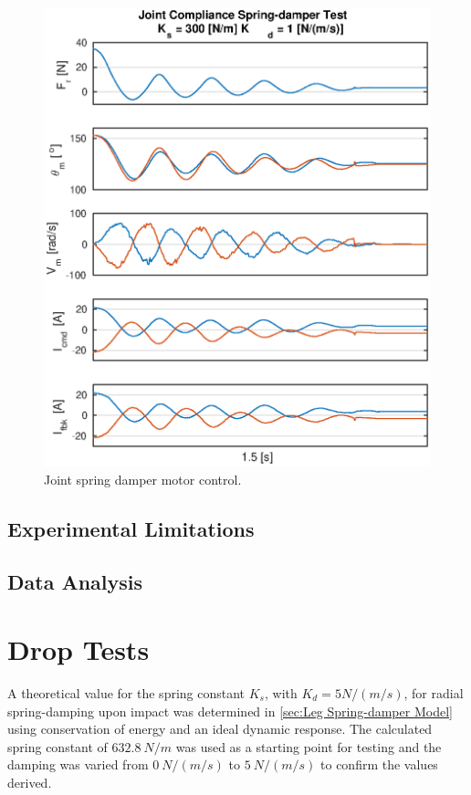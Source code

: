 \begin{figure}
\centering
\includegraphics[width=1\textwidth]{images/experiments/joint-spring-damper-control-output.eps} 
\caption{Joint spring damper motor control.}
\label{fig:joint-spring-damper-motor-control}
\end{figure}

\subsection{Experimental Limitations}

\subsection{Data Analysis}

\section{Drop Tests}

A theoretical value for the spring constant $K_s$, with $K_d = 5 N/(m/s)$, for radial spring-damping upon impact was determined in \cref{sec:Leg Spring-damper Model} using conservation of energy and an ideal dynamic response. The calculated spring constant of $632.8\ N/m$ was used as a starting point for testing and the damping was varied from $0\ N/(m/s)$ to $5\ N/(m/s)$ to confirm the values derived.

